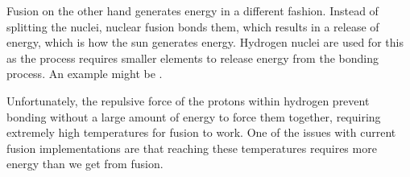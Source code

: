 \documentclass[11pt, titlepage]{article}
\begin{document}
Fusion on the other hand generates energy in a different fashion.  Instead of splitting the nuclei, nuclear fusion bonds them, which results in a release of energy, which is how the sun generates energy.  Hydrogen nuclei are used for this as the process requires smaller elements to release energy from the bonding process.  An example might be .  

Unfortunately, the repulsive force of the protons within hydrogen prevent bonding without a large amount of energy to force them together, requiring extremely high temperatures for fusion to work.  One of the issues with current fusion implementations are that reaching these temperatures requires more energy than we get from fusion.
\end{document}
